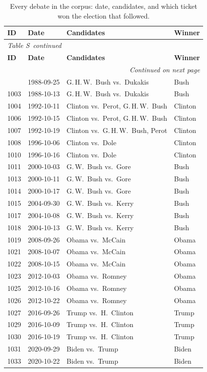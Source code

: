 \documentclass[pdflatex,sn-apa]{sn-jnl}%
\renewcommand{\thetable}{S\arabic{table}}
\begin{document}
\begin{longtable}{
@{}
l
l
>{\raggedright\arraybackslash}p{}
l
@{}
}

\caption{Every debate in the corpus: date, candidates, and which ticket won
the election that followed.}
\label{s:tab:inventory}\\

\toprule
\textbf{ID} & \textbf{Date} & \textbf{Candidates} & \textbf{Winner} \\
\midrule
\endfirsthead

\multicolumn{4}{l}{\textit{Table \thetable\ continued}}\\
\toprule
\textbf{ID} & \textbf{Date} & \textbf{Candidates} & \textbf{Winner} \\
\midrule
\endhead

\midrule
\multicolumn{4}{r}{\textit{Continued on next page}}\\
\endfoot

\bottomrule
\endlastfoot
1001 & 1988-09-25 & G.\,H.\,W.\ Bush vs.\ Dukakis & Bush \\
1003 & 1988-10-13 & G.\,H.\,W.\ Bush vs.\ Dukakis & Bush \\
1004 & 1992-10-11 & Clinton vs.\ Perot, G.\,H.\,W.\ Bush & Clinton \\
1006 & 1992-10-15 & Clinton vs.\ Perot, G.\,H.\,W.\ Bush & Clinton \\
1007 & 1992-10-19 & Clinton vs.\ G.\,H.\,W.\ Bush, Perot & Clinton \\
1008 & 1996-10-06 & Clinton vs.\ Dole & Clinton \\
1010 & 1996-10-16 & Clinton vs.\ Dole & Clinton \\
1011 & 2000-10-03 & G.\,W.\ Bush vs.\ Gore & Bush \\
1013 & 2000-10-11 & G.\,W.\ Bush vs.\ Gore & Bush \\
1014 & 2000-10-17 & G.\,W.\ Bush vs.\ Gore & Bush \\
1015 & 2004-09-30 & G.\,W.\ Bush vs.\ Kerry & Bush \\
1017 & 2004-10-08 & G.\,W.\ Bush vs.\ Kerry & Bush \\
1018 & 2004-10-13 & G.\,W.\ Bush vs.\ Kerry & Bush \\
1019 & 2008-09-26 & Obama vs.\ McCain & Obama \\
1021 & 2008-10-07 & Obama vs.\ McCain & Obama \\
1022 & 2008-10-15 & Obama vs.\ McCain & Obama \\
1023 & 2012-10-03 & Obama vs.\ Romney & Obama \\
1025 & 2012-10-16 & Obama vs.\ Romney & Obama \\
1026 & 2012-10-22 & Obama vs.\ Romney & Obama \\
1027 & 2016-09-26 & Trump vs.\ H.\ Clinton & Trump \\
1029 & 2016-10-09 & Trump vs.\ H.\ Clinton & Trump \\
1030 & 2016-10-19 & Trump vs.\ H.\ Clinton & Trump \\
1031 & 2020-09-29 & Biden vs.\ Trump & Biden \\
1033 & 2020-10-22 & Biden vs.\ Trump & Biden \\
\bottomrule
\end{longtable}
\end{document}
